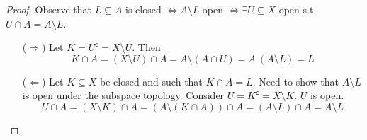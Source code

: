\begin{proof}
   Observe that \( L \subseteq A \) is closed 
   \( \iff A \setminus L \) open
   \( \iff \exists U \subseteq X \) open s.t. \( U \cap A = A \setminus L \).

   \begin{enumerate}
     \item[(\(\Rightarrow\))] Let \( K = U^\mathsf{c} = X \setminus U \).
       Then 
       \[
        K \cap A = (X \setminus U) \cap A = A \setminus (A \cap U) = A \ (A \setminus L) = L
       \]
     \item[(\( \Leftarrow \))] Let \( K \subseteq X \) be closed and such that \( K \cap A = L \).
       Need to show that \( A \setminus L \) is open under the subspace topology.
       Consider \( U = K^{\mathsf{c}} = X \setminus K\). \( U \) is open.
       \[
         U \cap A = (X \setminus K) \cap A = (A \setminus (K \cap A)) \cap A = (A \setminus L) \cap A = A \setminus L
       \]

   \end{enumerate}
\end{proof}
